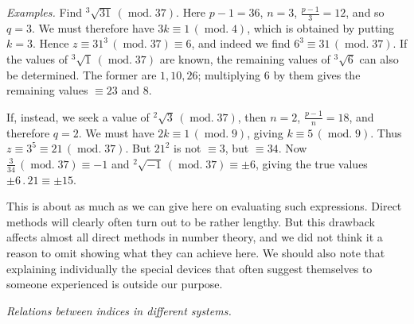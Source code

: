 \emph{Examples.} Find ${}^{3}\!\surd{31}\,(\operatorname{mod.}37)$. Here $p-1=36$, $n=3$, $\frac{p-1}{3}=12$, and so $q=3$. We must therefore have $3k\equiv1\,(\operatorname{mod.}4)$, which is obtained by putting $k=3$. Hence $z\equiv31^3\,(\operatorname{mod.}37)\equiv6$, and indeed we find $6^3\equiv31\,(\operatorname{mod.}37)$. If the values of ${}^{3}\!\surd{1}\,(\operatorname{mod.}37)$ are known, the remaining values of ${}^{3}\!\surd{6}$ can also be determined. The former are $1,10,26$; multiplying $6$ by them gives the remaining values $\equiv23$ and $8$.

If, instead, we seek a value of ${}^{2}\!\surd{3}\,(\operatorname{mod.}37)$, then $n=2$, $\frac{p-1}{n}=18$, and therefore $q=2$. We must have $2k\equiv1\,(\operatorname{mod.}9)$, giving $k\equiv5\,(\operatorname{mod.}9)$. Thus $z\equiv3^5\equiv21\,(\operatorname{mod.}37)$. But $21^2$ is not $\equiv3$, but $\equiv34$. Now $\frac{3}{34}\,(\operatorname{mod.}37)\equiv-1$ and ${}^{2}\!\surd{-1}\,(\operatorname{mod.}37)\equiv\pm6$, giving the true values $\pm6\,.\,21\equiv\pm15$.

This is about as much as we can give here on evaluating such expressions. Direct methods will clearly often turn out to be rather lengthy. But this drawback affects almost all direct methods in number theory, and we did not think it a reason to omit showing what they can achieve here. We should also note that explaining individually the special devices that often suggest themselves to someone experienced is outside our purpose.

\begin{center}\emph{Relations between indices in different systems.}\end{center}

